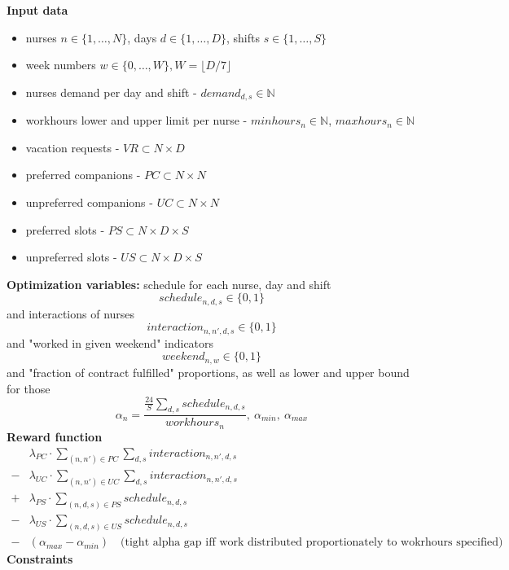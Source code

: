 \documentclass{article}
\newcommand{\N}{\mathbb{N}}
\begin{document}
\noindent \textbf{Input data}
\begin{itemize}
    \item nurses $n\in \{1, \dots, N\}$, days $d\in \{1, \dots, D\}$, shifts $s\in \{1, \dots, S\}$
    \item week numbers $w\in\{0, \dots, W\}, W=\lfloor D/7 \rfloor$
    \item nurses demand per day and shift - $demand_{d,s} \in \N$
    \item workhours lower and upper limit per nurse - $minhours_n \in \N$, $maxhours_n \in \N$
    \item vacation requests - $VR \subset N \times D$
    \item preferred companions - $PC \subset N \times N$
    \item unpreferred companions - $UC \subset N \times N$
    \item preferred slots - $PS \subset N \times D \times S$
    \item unpreferred slots - $US \subset N \times D \times S$
\end{itemize}
\textbf{Optimization variables:} schedule for each nurse, day and shift 
$$schedule_{n,d,s} \in \{0,1\}$$
and interactions of nurses \quad {}
$$interaction_{n,n',d,s} \in \{0,1\}$$
and "worked in given weekend" indicators
$$weekend_{n, w} \in \{0, 1\}$$
and "fraction of contract fulfilled" proportions, as well as lower and upper bound for those
$$\alpha_n = \frac{\frac{24}{S}\sum_{d,s}schedule_{n,d,s}}{workhours_n},\ \alpha_{min},\ \alpha_{max}$$
\textbf{Reward function}
\begin{align*}
     &\lambda_{PC}\cdot\sum_{(n, n')\in PC}\sum_{d,s} interaction_{n,n',d,s} \\
    -&\lambda_{UC}\cdot\sum_{(n, n')\in UC}\sum_{d,s} interaction_{n,n',d,s} \\ 
    +&\lambda_{PS}\cdot\sum_{(n, d, s)\in PS} schedule_{n,d,s} \\ 
    -&\lambda_{US}\cdot\sum_{(n, d, s)\in US} schedule_{n,d,s} \\
    -&(\alpha_{max} - \alpha_{min})\quad \text{(tight alpha gap iff work distributed proportionately to wokrhours specified)}
\end{align*}
\textbf{Constraints}
\end{document}
